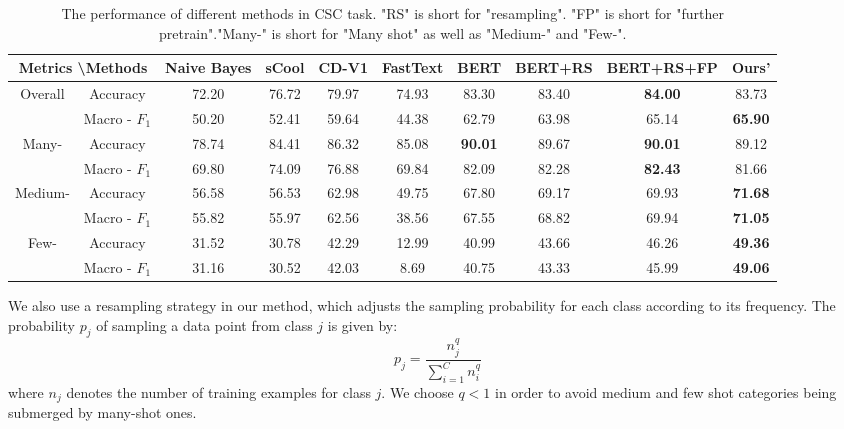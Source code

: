 \documentclass{article}
\begin{document}
\begin{table*}[htbp]
\centering
\begin{tabular}{cc||ccccc|cc|c}

\toprule
  \multicolumn{2}{c||}{Metrics \textbackslash Methods}  & Naive Bayes & sCool & CD-V1  &FastText  &  BERT      & BERT+RS            & BERT+RS+FP      & Ours'          \\ \midrule
\multirow{2}{*}{Overall}            & Accuracy          & 72.20       & 76.72 & 79.97 &74.93   & 83.30         &83.40            &\textbf{84.00}    & 83.73      \\ 
& Macro - $F_1$     & 50.20       & 52.41 & 59.64  &44.38  & 62.79         &63.98            & 65.14        & \textbf{65.90}      \\ \midrule 
\multirow{2}{*}{Many-}          & Accuracy          & 78.74       & 84.41 & 86.32 &85.08   &\textbf{90.01} &89.67            &\textbf{90.01}& 89.12               \\ 
& Macro - $F_1$     & 69.80       & 74.09 & 76.88 &69.84    &82.09          &82.28            &\textbf{82.43}& 81.66               \\ \midrule
\multirow{2}{*}{Medium-}        & Accuracy          & 56.58       & 56.53 & 62.98  &49.75  & 67.80         &69.17            & 69.93        & \textbf{71.68}      \\ 
& Macro - $F_1$     & 55.82       & 55.97 & 62.56 &38.56   & 67.55         &68.82            & 69.94        & \textbf{71.05}      \\ \midrule
\multirow{2}{*}{Few-}           & Accuracy          & 31.52       & 30.78 & 42.29  &12.99  & 40.99         &43.66            & 46.26        & \textbf{49.36}      \\ 
& Macro - $F_1$     & 31.16       & 30.52 & 42.03  &8.69  & 40.75         &43.33            & 45.99        & \textbf{49.06}      \\ 
\bottomrule

\end{tabular}
\caption{The performance of different methods in CSC task. "RS" is short for "resampling". "FP" is short for "further pretrain"."Many-" is short for "Many shot" as well as "Medium-" and "Few-".}
\label{tab:result-s}
\end{table*}

We also use a resampling strategy in our method, which adjusts the sampling probability for each class according to its frequency. The probability $p_j$ of sampling a data point from class $j$ is given by:
\begin{equation}
p_{j}=\frac{n_{j}^{q}}{\sum_{i=1}^{C} n_{i}^{q}}
\end{equation}
where $n_j$ denotes the number of training examples for class $j$. We choose $q < 1$ in order to avoid medium and few shot categories being submerged by many-shot ones. 
\end{document}
